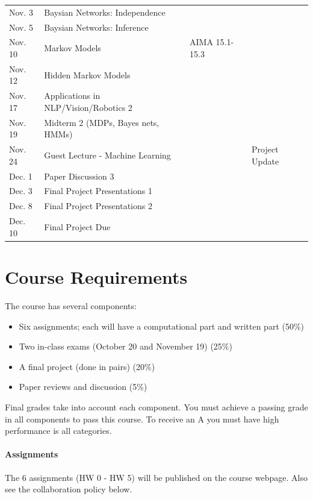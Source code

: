 \documentclass[11pt]{article}
\begin{document}
\begin{center}
\begin{tabular}{llll}
 Nov. 3 & Baysian Networks: Independence & & \\
 Nov. 5 & Baysian Networks: Inference & & \\
 Nov. 10 & Markov Models &AIMA 15.1-15.3 & \\
 Nov. 12 & Hidden Markov Models & & \\
 Nov. 17 & Applications in NLP/Vision/Robotics 2  & & \\
 Nov. 19 & Midterm 2 (MDPs, Bayes nets, HMMs)  & & \\
 Nov. 24 & Guest Lecture - Machine Learning && Project Update \\
 Dec. 1 & Paper Discussion 3  & & \\
 Dec. 3 & Final Project Presentations 1  & & \\
 Dec. 8 & Final Project Presentations 2 & & \\
 Dec. 10 & Final Project Due  & &\\
\bottomrule
\end{tabular}
 \end{center}

\vspace {0.25cm}
\section{Course Requirements}

The course has several components:

\begin{itemize}
\item Six assignments; each will have a computational part and written part (50\%)
\item Two in-class exams (October 20 and November 19) (25\%)
\item A final project (done in pairs) (20\%)
\item Paper reviews and discussion (5\%)
\end{itemize}


\noindent Final grades take into account each component. You must achieve a passing grade in all components to pass this course. To receive an A you must have high performance is all categories.

\paragraph{Assignments}

The 6 assignments (HW 0 - HW 5) will be published on the course
webpage. Also see the collaboration policy below.
\end{document}
